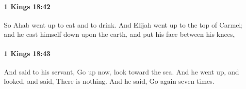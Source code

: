 		\paragraph{1 Kings 18:42} %
			\label{1KINGS-18-42}

			So Ahab went up to eat and to drink. And Elijah went up to the top of Carmel; and he cast himself down upon the earth, and put his face between his knees,


		\paragraph{1 Kings 18:43} %
			\label{1KINGS-18-43}

			And said to his servant, Go up now, look toward the sea. And he went up, and looked, and said, There is nothing. And he said, Go again seven times.


